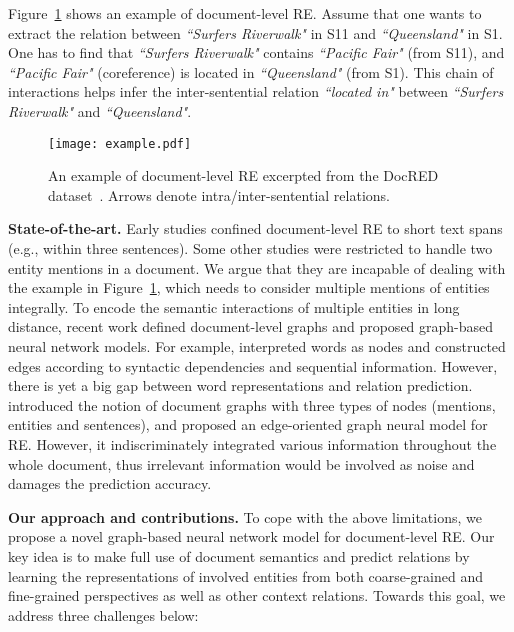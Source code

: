 \documentclass[11pt,a4paper]{article}
\begin{document}
Figure~\ref{fig:example} shows an example of document-level RE. Assume that one wants to extract the relation between \textit{``Surfers Riverwalk"} in S11 and \textit{``Queensland"} in S1. One has to find that \textit{``Surfers Riverwalk"} contains \textit{``Pacific Fair"} (from S11), and  \textit{``Pacific Fair"} (coreference) is located in \textit{``Queensland"} (from S1). This chain of interactions helps infer the inter-sentential relation \textit{``located in"} between \textit{``Surfers Riverwalk"} and \textit{``Queensland"}.

\begin{figure}
	\centering
	\texttt{[image: example.pdf]}
	\caption{An example of document-level RE excerpted from the DocRED dataset~\cite{yao2019docred}. Arrows denote intra/inter-sentential relations.}
	\label{fig:example}
\end{figure}

\smallskip
\noindent\textbf{State-of-the-art.} Early studies \cite{peng2017cross,quirk2017distant} confined document-level RE to short text spans (e.g., within three sentences). Some other studies \cite{nguyen2018convolutional,gupta2019neural} were restricted to handle two entity mentions in a document. We argue that they are incapable of dealing with the example in Figure~\ref{fig:example}, which needs to consider multiple mentions of entities integrally. To encode the semantic interactions of multiple entities in long distance, recent work defined document-level graphs and proposed graph-based neural network models. For example, \citet{sahu2019inter,gupta2019neural} interpreted words as nodes and constructed edges according to syntactic dependencies and sequential information. However, there is yet a big gap between word representations and relation prediction. \citet{christopoulou2019connecting} introduced the notion of document graphs with three types of nodes (mentions, entities and sentences), and proposed an edge-oriented graph neural model for RE. However, it indiscriminately integrated various information throughout the whole document, thus irrelevant information would be involved as noise and damages the prediction accuracy.

\smallskip
\noindent\textbf{Our approach and contributions.} To cope with the above limitations, we propose a novel graph-based neural network model for document-level RE. Our key idea is to make full use of document semantics and predict relations by learning the representations of involved entities from both coarse-grained and fine-grained perspectives as well as other context relations. Towards this goal, we address three challenges below:
\end{document}
